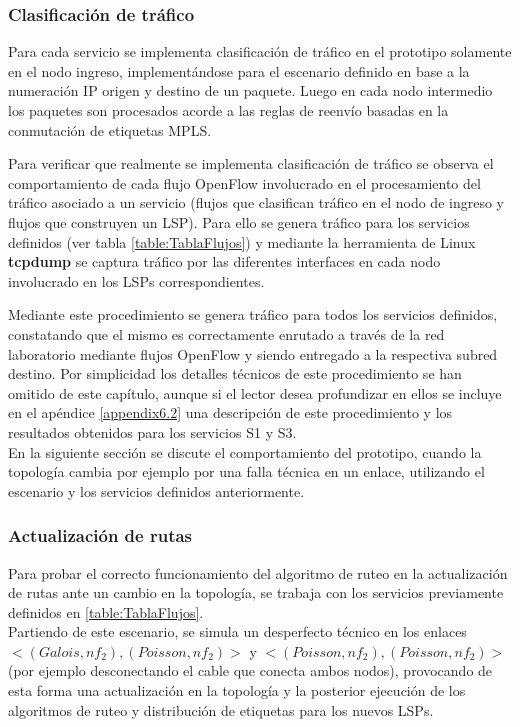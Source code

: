 \subsubsection{Clasificaci\'on de tr\'afico}
Para cada servicio se implementa clasificaci\'on de tr\'afico en el prototipo solamente en el nodo ingreso, implementándose para el escenario definido en base a la numeraci\'on IP origen y destino de un paquete. Luego en cada nodo intermedio los paquetes son procesados acorde a las reglas de reenvío basadas en la conmutación de etiquetas MPLS.

Para verificar que realmente se implementa clasificaci\'on de tr\'afico se observa el comportamiento de cada flujo OpenFlow involucrado en el procesamiento del tr\'afico asociado a un servicio (flujos que clasifican tr\'afico en el nodo de ingreso y flujos que construyen un LSP). Para ello se genera tr\'afico para los servicios definidos (ver tabla \ref{table:TablaFlujos}) y mediante la herramienta de Linux \textbf{tcpdump} se captura tr\'afico por las diferentes interfaces en cada nodo involucrado en los LSPs correspondientes. 

Mediante este procedimiento se genera tr\'afico para todos los servicios definidos, constatando que el mismo es correctamente enrutado a trav\'es de la red laboratorio mediante flujos OpenFlow y siendo entregado a la respectiva subred destino. Por simplicidad los detalles t\'ecnicos de este procedimiento se han omitido de este cap\'itulo, aunque si el lector desea profundizar en ellos se incluye en el ap\'endice \ref{appendix6.2} una descripci\'on de este procedimiento y los resultados obtenidos para los servicios S1 y S3.\\

En la siguiente secci\'on se discute el comportamiento del prototipo, cuando la topolog\'ia cambia por ejemplo por una falla t\'ecnica en un enlace, utilizando el escenario y los servicios definidos anteriormente.

\subsubsection{Actualizaci\'on de rutas}
Para probar el correcto funcionamiento del algoritmo de ruteo en la actualizaci\'on de rutas ante un cambio en la topolog\'ia, se trabaja con los servicios previamente definidos en \ref{table:TablaFlujos}.\\ 

Partiendo de este escenario, se simula un desperfecto t\'ecnico en los enlaces \\ $<(Galois, nf_2), (Poisson, nf_2)>$ y  $<(Poisson, nf_2), (Poisson, nf_2)>$ (por ejemplo desconectando el cable que conecta ambos nodos), provocando de esta forma una actualizaci\'on en la topolog\'ia y la posterior ejecuci\'on de los algoritmos de ruteo y distribución de etiquetas para los nuevos LSPs.\\ 
 

